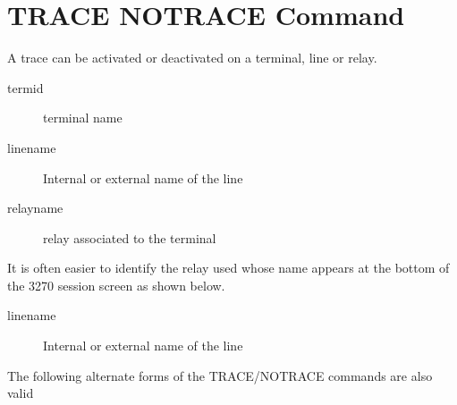 \documentclass[letterpaper,10pt,english]{sphinxmanual}
\begin{document}
\section{TRACE \textbar{} NOTRACE Command}
\label{\detokenize{audit_operations_ and_performance:trace-notrace-command}}\label{\detokenize{audit_operations_ and_performance:index-27}}
A trace can be activated or deactivated on a terminal, line or relay.

\begin{sphinxVerbatim}[commandchars=\\\{\}]
\end{sphinxVerbatim}
\begin{description}
\item[{termid}] \leavevmode
terminal name

\item[{linename}] \leavevmode
Internal or external name of the line

\item[{relayname}] \leavevmode
relay associated to the terminal

\end{description}

It is often easier to identify the relay used whose name appears at the bottom of the 3270 session screen as shown below.

\begin{description}
\item[{linename}] \leavevmode
Internal or external name of the line

\end{description}

The following alternate forms of the TRACE/NOTRACE commands are also  valid
\end{document}
